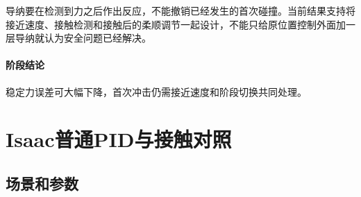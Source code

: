 
导纳要在检测到力之后作出反应，不能撤销已经发生的首次碰撞。当前结果支持将接近速度、接触检测和接触后的柔顺调节一起设计，不能只给原位置控制外面加一层导纳就认为安全问题已经解决。


\paragraph{阶段结论}稳定力误差可大幅下降，首次冲击仍需接近速度和阶段切换共同处理。




\FloatBarrier

\section{Isaac普通PID与接触对照}

\label{stage:s11}

\subsection{场景和参数}\label{s11-detail-1}

